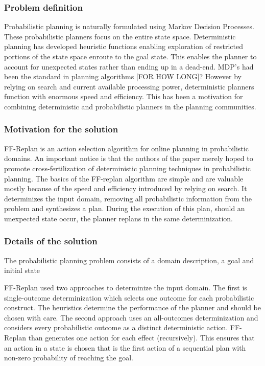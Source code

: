 \documentclass[runningheads,a4paper]{llncs}
\begin{document}
\subsubsection{Problem definition}
Probabilistic planning is naturally formulated using Markov Decision Processes. These probabilistic planners focus on the entire state space. Deterministic planning has developed heuristic functions enabling exploration of restricted portions of the state space enroute to the goal state. This enables the planner to account for unexpected states rather than ending up in a dead-end. MDP's had been the standard in planning algorithms [FOR HOW LONG]? However by relying on search and current available processing power, deterministic planners function with enormous speed and efficiency. This has been a motivation for combining deterministic and probabilistic planners in the planning communities.

\subsubsection{Motivation for the solution}
FF-Replan is an action selection algorithm for online planning in probabilistic domains. An important notice is that the authors of the paper merely hoped to promote cross-fertilization of deterministic planning techniques in probabilistic planning. The basics of the FF-replan algorithm are simple and are valuable mostly because of the speed and efficiency introduced by relying on search.  It determinizes the input domain, removing all probabilistic information from the problem and synthesizes a plan. During the execution of this plan, should an unexpected state occur, the planner replans in the same determinization.

\subsubsection{Details of the solution}
The probabilistic planning problem consists of a domain description, a goal and initial state

FF-Replan used two approaches to determinize the input domain. The first is single-outcome determinization which selects one outcome for each probabilistic construct. The heuristics determine the performance of the planner and should be chosen with care. The second approach uses an all-outcomes determinization and considers every probabilistic outcome as a distinct deterministic action. FF-Replan than generates one action for each effect (recursively). This ensures that an action in a state is chosen that is the first action of a sequential plan with non-zero probability of reaching the goal.
\end{document}
